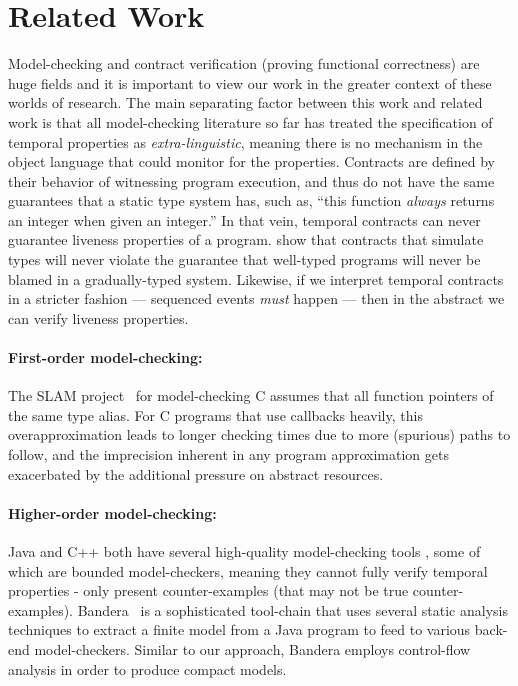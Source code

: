 \documentclass[preprint,onecolumn,9pt]{sigplanconf} %
\begin{document}
\section{Related Work}

Model-checking and contract verification (proving functional correctness) are huge fields and it is important to view our work in the greater context of these worlds of research.
%
The main separating factor between this work and related work is that all model-checking literature so far has treated the specification of temporal properties as \emph{extra-linguistic}, meaning there is no mechanism in the object language that could monitor for the properties.
%
Contracts are defined by their behavior of witnessing program execution, and thus do not have the same guarantees that a static type system has, such as, ``this function \emph{always} returns an integer when given an integer.''
%
In that vein, temporal contracts can never guarantee liveness properties of a program.
%
\citet{ianjohnson:dthf:complete} show that contracts that simulate types will never violate the guarantee that well-typed programs will never be blamed in a gradually-typed system.
%
Likewise, if we interpret temporal contracts in a stricter fashion --- sequenced events \emph{must} happen --- then in the abstract we can verify liveness properties.

\paragraph{First-order model-checking:}
The SLAM project~\citep{ianjohnson:Ball:2002:SLP:503272.503274} for model-checking C assumes that all function pointers of the same type alias.
%
For C programs that use callbacks heavily, this overapproximation leads to longer checking times due to more (spurious) paths to follow, and the imprecision inherent in any program approximation gets exacerbated by the additional pressure on abstract resources.

\paragraph{Higher-order model-checking:}
Java and C++ both have several high-quality model-checking tools \citep{ianjohnson:bandera, ianjohnson:java-pathfinder, ianjohnson:LLBMC}, some of which are bounded model-checkers, meaning they cannot fully verify temporal properties - only present counter-examples (that may not be true counter-examples).
%
Bandera~\citep{ianjohnson:bandera} is a sophisticated tool-chain that uses several static analysis techniques to extract a finite model from a Java program to feed to various back-end model-checkers.
%
Similar to our approach, Bandera employs control-flow analysis in order to produce compact models.
\end{document}
